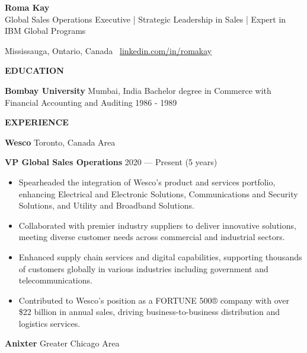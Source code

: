 \documentclass[11pt]{article}
\begin{document}
    \begin{center}
        \textbf{\LARGE Roma Kay}\\ 
        \small Global Sales Operations Executive | Strategic Leadership in Sales | Expert in IBM Global Programs
        \hrulefill
    \end{center}

    \begin{center}
        Mississauga, Ontario, Canada \textbullet \ \href{https://linkedin.com/in/romakay}{linkedin.com/in/romakay}
    \end{center}

    \vspace{8pt}
    \begin{center}
        \textbf{\large EDUCATION}
    \end{center}
    \textbf{Bombay University} \hfill Mumbai, India
Bachelor degree in Commerce with Financial Accounting and Auditing \hfill 1986 - 1989
\vspace{4pt}

    \vspace{16pt}
    \begin{center}
        \textbf{\large EXPERIENCE}
    \end{center}
    \textbf{Wesco} \hfill Toronto, Canada Area

\textbf{VP Global Sales Operations} \hfill 2020 — Present (5 years)
\begin{itemize}[noitemsep, topsep=0pt, partopsep=0pt, parsep=0pt]
    \item Spearheaded the integration of Wesco's product and services portfolio, enhancing Electrical and Electronic Solutions, Communications and Security Solutions, and Utility and Broadband Solutions.
    \item Collaborated with premier industry suppliers to deliver innovative solutions, meeting diverse customer needs across commercial and industrial sectors.
    \item Enhanced supply chain services and digital capabilities, supporting thousands of customers globally in various industries including government and telecommunications.
    \item Contributed to Wesco's position as a FORTUNE 500® company with over \$22 billion in annual sales, driving business-to-business distribution and logistics services.
\end{itemize}
\vspace{8pt}
\textbf{Anixter} \hfill Greater Chicago Area
\end{document}
